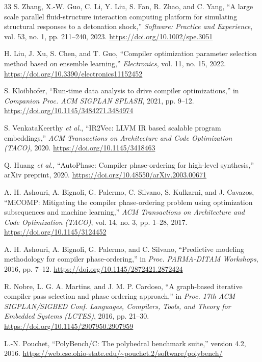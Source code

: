 \documentclass[conference]{IEEEtran}
\begin{document}
\begin{thebibliography}{33}
S. Zhang, X.-W. Guo, C. Li, Y. Liu, S. Fan, R. Zhao, and C. Yang,
``A large scale parallel fluid-structure interaction computing platform for simulating structural responses to a detonation shock,''
\textit{Software: Practice and Experience}, vol. 53, no. 1, pp. 211--240, 2023.
\url{https://doi.org/10.1002/spe.3051}

H. Liu, J. Xu, S. Chen, and T. Guo,
``Compiler optimization parameter selection method based on ensemble learning,''
\textit{Electronics}, vol. 11, no. 15, 2022.
\url{https://doi.org/10.3390/electronics11152452}

S. Kloibhofer,
``Run-time data analysis to drive compiler optimizations,''
in \textit{Companion Proc. ACM SIGPLAN SPLASH}, 2021, pp. 9--12.
\url{https://doi.org/10.1145/3484271.3484974}

S. VenkataKeerthy \textit{et al.},
``IR2Vec: LLVM IR based scalable program embeddings,''
\textit{ACM Transactions on Architecture and Code Optimization (TACO)}, 2020.
\url{https://doi.org/10.1145/3418463}

Q. Huang \textit{et al.},
``AutoPhase: Compiler phase-ordering for high-level synthesis,''
arXiv preprint, 2020.
\url{https://doi.org/10.48550/arXiv.2003.00671}

A. H. Ashouri, A. Bignoli, G. Palermo, C. Silvano, S. Kulkarni, and J. Cavazos,
``MiCOMP: Mitigating the compiler phase-ordering problem using optimization subsequences and machine learning,''
\textit{ACM Transactions on Architecture and Code Optimization (TACO)}, vol. 14, no. 3, pp. 1--28, 2017.
\url{https://doi.org/10.1145/3124452}

A. H. Ashouri, A. Bignoli, G. Palermo, and C. Silvano,
``Predictive modeling methodology for compiler phase-ordering,''
in \textit{Proc. PARMA-DITAM Workshops}, 2016, pp. 7--12.
\url{https://doi.org/10.1145/2872421.2872424}

R. Nobre, L. G. A. Martins, and J. M. P. Cardoso,
``A graph-based iterative compiler pass selection and phase ordering approach,''
in \textit{Proc. 17th ACM SIGPLAN/SIGBED Conf. Languages, Compilers, Tools, and Theory for Embedded Systems (LCTES)}, 2016, pp. 21--30.
\url{https://doi.org/10.1145/2907950.2907959}

L.-N. Pouchet,
``PolyBench/C: The polyhedral benchmark suite,'' version 4.2, 2016.
\url{https://web.cse.ohio-state.edu/~pouchet.2/software/polybench/}


\end{thebibliography}
\end{document}
